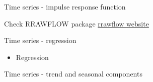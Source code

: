 \documentclass[9pt,ignorenonframetext,]{beamer}
\providecommand{\tightlist}{%
  \setlength{\itemsep}{0pt}\setlength{\parskip}{0pt}}
\begin{document}
\begin{frame}{Time series - impulse response function}

Check RRAWFLOW package
\href{https://sd.water.usgs.gov/projects/RRAWFLOW/RRAWFLOW.html}{rrawflow
website}

\end{frame}

\begin{frame}{Time series - regression}

\begin{itemize}
\tightlist
\item
  Regression
\end{itemize}

\end{frame}

\begin{frame}[fragile]{Time series - trend and seasonal components}


\end{frame}
\end{document}
